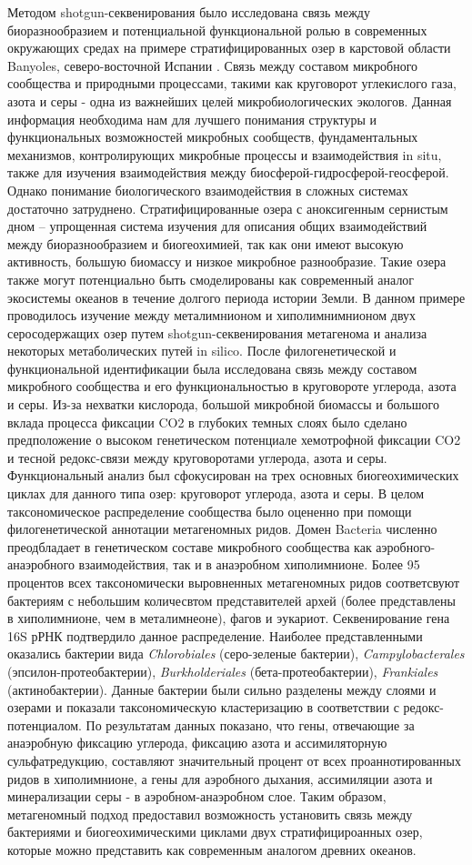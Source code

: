 Методом shotgun-секвенирования было исследована связь между биоразнообразием и потенциальной функциональной ролью в современных окружающих средах на примере стратифицированных озер  в карстовой области Banyoles, северо-восточной Испании \cite{MLO2015}. Связь между составом микробного сообщества и природными процессами, такими как круговорот углекислого газа, азота и серы  - одна из важнейших целей микробиологических экологов. Данная информация необходима нам для лучшего понимания структуры и функциональных возможностей микробных сообществ, фундаментальных механизмов, контролирующих микробные процессы и взаимодействия in situ, также для изучения взаимодействия между биосферой-гидросферой-геосферой. Однако понимание биологического взаимодействия в сложных системах достаточно затруднено.  Стратифицированные озера с аноксигенным сернистым дном – упрощенная система изучения для описания общих взаимодействий между биоразнообразием и биогеохимией, так как они имеют высокую активность, большую биомассу и низкое микробное разнообразие. Такие озера также могут потенциально быть смоделированы как современный аналог экосистемы океанов в течение долгого периода истории Земли. В данном примере проводилось изучение между металимнионом и хиполимнимнионом двух серосодержащих озер путем  shotgun-секвенирования метагенома и анализа некоторых метаболических путей in silico. После филогенетической и функциональной идентификации была исследована связь между составом микробного сообщества и его функциональностью в круговороте углерода, азота и серы. Из-за нехватки кислорода, большой микробной биомассы и большого вклада процесса фиксации CO2 в глубоких темных слоях было сделано предположение о высоком генетическом потенциале хемотрофной фиксации CO2 и тесной редокс-связи между круговоротами углерода, азота и серы. Функциональный анализ был сфокусирован на трех основных биогеохимических циклах для данного типа озер: круговорот углерода, азота и серы. В целом таксономическое распределение сообщества было оцененно при помощи филогенетической аннотации метагеномных ридов. Домен Bacteria численно преодбладает в генетическом составе микробного сообщества как аэробного-анаэробного взаимодействия, так и в анаэробном хиполимнионе. Более 95  процентов  всех таксономически выровненных метагеномных ридов соответсвуют бактериям с небольшим количесвтом представителей архей (более представлены в хиполимнионе, чем в металимнеоне), фагов и эукариот.  Секвенирование гена 16S рРНК подтвердило данное распределение. Наиболее представленными оказались бактерии вида \textit{Chlorobiales} (серо-зеленые бактерии), \textit{Campylobacterales} (эпсилон-протеобактерии), \textit{Burkholderiales} (бета-протеобактерии), \textit{Frankiales} (актинобактерии). Данные бактерии были сильно разделены между слоями и озерами и показали таксономическую кластеризацию в соответствии с редокс-потенциалом. По результатам данных показано, что гены, отвечающие за анаэробную фиксацию углерода, фиксацию азота и ассимиляторную сульфатредукцию, составляют значительный процент от всех проаннотированных ридов в хиполимнионе,  а гены для аэробного дыхания, ассимиляции азота и минерализации серы - в аэробном-анаэробном слое.  Таким образом, метагеномный подход предоставил возможность установить связь между бактериями и биогеохимическими циклами двух стратифицироанных озер, которые можно представить как современным аналогом древних океанов. 